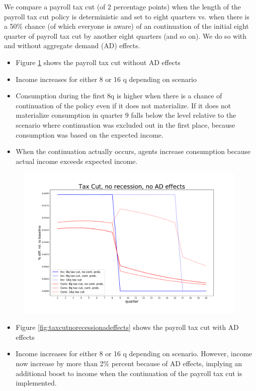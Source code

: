 \documentclass[]{article}
\begin{document}
We compare a payroll tax cut (of 2 percentage points) when the length of the payroll tax cut policy is deterministic and set to eight quarters vs. when there is a 50\% chance (of which everyone is aware) of an continuation of the initial eight quarter of payroll tax cut by another eight quarters (and so on). We do so with and without aggregate demand (AD) effects.

\begin{itemize}
	\item Figure \ref{fig:taxcutnorecessionnoadeffects} shows the payroll tax cut without AD effects
	\item Income increases for either 8 or 16 q depending on scenario
	\item Consumption during the first 8q is higher when there is a chance of continuation of the policy even if it does not materialize. If it does not materialize consumption in quarter 9 falls below the level relative to the scenario where continuation was excluded out in the first place, because consumption was based on the expected income.
	\item When the continuation actually occurs, agents increase consumption because actual income exceeds expected income.
\end{itemize}

\begin{figure}
	\centering
	\includegraphics[width=\linewidth]{../Continuation_Prob_0/tax_cut_no_recession_no_AD_effects}
	\caption{}
	\label{fig:taxcutnorecessionnoadeffects}
\end{figure}

\begin{itemize}
	\item Figure \ref{fig:taxcutnorecessionadeffects} shows the payroll tax cut with AD effects
	\item Income increases for either 8 or 16 q depending on scenario. However, income now increase by more than 2\% percent because of AD effects, implying an additional boost to income when the continuation of the payroll tax cut is implemented.
\end{itemize}
	
\end{document}
